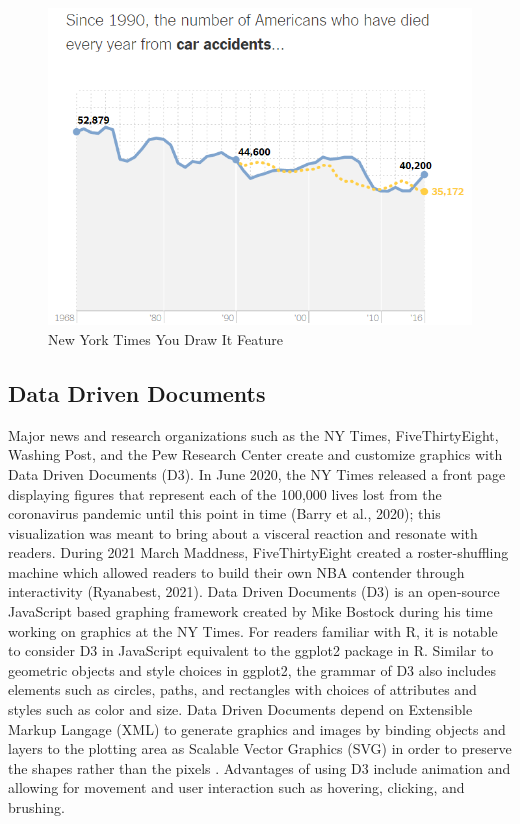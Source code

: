 \documentclass[print]{nuthesis}
\begin{document}
\begin{figure}[tbp]

{\centering \includegraphics[width=0.75\linewidth,]{images/nyt-caraccidents-frame4} 

}

\caption{New York Times You Draw It Feature}\label{fig:nyt-caraccidents}
\end{figure}

\hypertarget{data-driven-documents}{%
\subsection{Data Driven Documents}\label{data-driven-documents}}

Major news and research organizations such as the NY Times, FiveThirtyEight, Washing Post, and the Pew Research Center create and customize graphics with Data Driven Documents (D3).
In June 2020, the NY Times released a front page displaying figures that represent each of the 100,000 lives lost from the coronavirus pandemic until this point in time (Barry et al., 2020); this visualization was meant to bring about a visceral reaction and resonate with readers.
During 2021 March Maddness, FiveThirtyEight created a roster-shuffling machine which allowed readers to build their own NBA contender through interactivity (Ryanabest, 2021).
Data Driven Documents (D3) is an open-source JavaScript based graphing framework created by Mike Bostock during his time working on graphics at the NY Times.
For readers familiar with R, it is notable to consider D3 in JavaScript equivalent to the ggplot2 package in R.
Similar to geometric objects and style choices in ggplot2, the grammar of D3 also includes elements such as circles, paths, and rectangles with choices of attributes and styles such as color and size.
Data Driven Documents depend on Extensible Markup Langage (XML) to generate graphics and images by binding objects and layers to the plotting area as Scalable Vector Graphics (SVG) in order to preserve the shapes rather than the pixels  .
Advantages of using D3 include animation and allowing for movement and user interaction such as hovering, clicking, and brushing.
\end{document}
